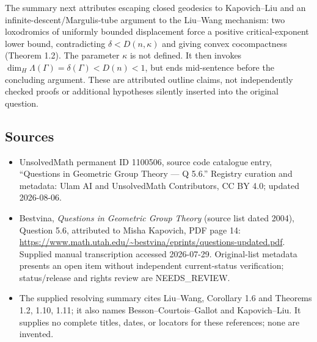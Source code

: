 \documentclass[11pt]{article}
\begin{document}
The summary next attributes escaping closed geodesics to Kapovich--Liu and an infinite-descent/Margulis-tube argument to the Liu--Wang mechanism: two loxodromics of uniformly bounded displacement force a positive critical-exponent lower bound, contradicting $\delta<D(n,\kappa)$ and giving convex cocompactness (Theorem 1.2). The parameter $\kappa$ is not defined. It then invokes $\dim_H\Lambda(\Gamma)=\delta(\Gamma)<D(n)<1$, but ends mid-sentence before the concluding argument. These are attributed outline claims, not independently checked proofs or additional hypotheses silently inserted into the original question.
\subsection{Sources}
\begin{itemize}
\item UnsolvedMath permanent ID 1100506, source code catalogue entry, ``Questions in Geometric Group Theory --- Q 5.6.'' Registry curation and metadata: Ulam AI and UnsolvedMath Contributors, CC BY 4.0; updated 2026-08-06.
\item Bestvina, \emph{Questions in Geometric Group Theory} (source list dated 2004), Question 5.6, attributed to Misha Kapovich, PDF page 14: \url{https://www.math.utah.edu/~bestvina/eprints/questions-updated.pdf}. Supplied manual transcription accessed 2026-07-29. Original-list metadata presents an open item without independent current-status verification; status/release and rights review are NEEDS\_REVIEW.
\item The supplied resolving summary cites Liu--Wang, Corollary 1.6 and Theorems 1.2, 1.10, 1.11; it also names Besson--Courtois--Gallot and Kapovich--Liu. It supplies no complete titles, dates, or locators for these references; none are invented.
\end{itemize}
\end{document}

